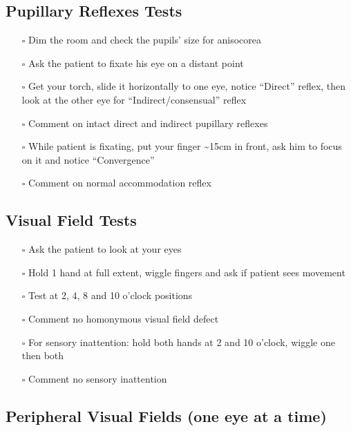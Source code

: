 \documentclass[
  13.5pt,
  a4paper,
  DIV=11,
  numbers=noendperiod]{scrreprt}
\providecommand{\tightlist}{%
  \setlength{\itemsep}{0pt}\setlength{\parskip}{0pt}}
\begin{document}
\subsection{Pupillary Reflexes Tests}\label{pupillary-reflexes-tests}

\begin{itemize}
\tightlist
\item[$\square$]
  Dim the room and check the pupils' size for anisocorea
\item[$\square$]
  Ask the patient to fixate his eye on a distant point
\item[$\square$]
  Get your torch, slide it horizontally to one eye, notice ``Direct''
  reflex, then look at the other eye for ``Indirect/consensual'' reflex
\item[$\square$]
  Comment on intact direct and indirect pupillary reflexes
\item[$\square$]
  While patient is fixating, put your finger \textasciitilde15cm in
  front, ask him to focus on it and notice ``Convergence''
\item[$\square$]
  Comment on normal accommodation reflex
\end{itemize}

\subsection{Visual Field Tests}\label{visual-field-tests}

\begin{itemize}
\tightlist
\item[$\square$]
  Ask the patient to look at your eyes
\item[$\square$]
  Hold 1 hand at full extent, wiggle fingers and ask if patient sees
  movement
\item[$\square$]
  Test at 2, 4, 8 and 10 o'clock positions
\item[$\square$]
  Comment no homonymous visual field defect
\item[$\square$]
  For sensory inattention: hold both hands at 2 and 10 o'clock, wiggle
  one then both
\item[$\square$]
  Comment no sensory inattention
\end{itemize}

\subsection{Peripheral Visual Fields (one eye at a
time)}\label{peripheral-visual-fields-one-eye-at-a-time}
\end{document}
